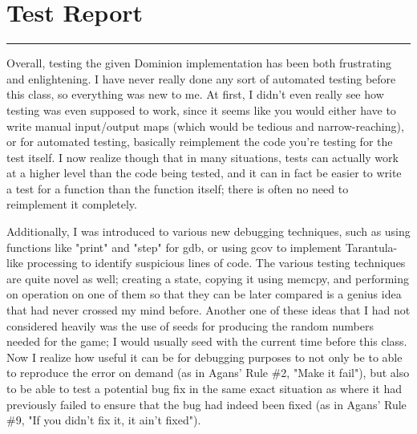 \documentclass[letterpaper,10pt,fleqn]{article}
\numberwithin{equation}{section}
\begin{document}

\section*{Test Report}
\hrule

Overall, testing the given Dominion implementation has been both frustrating and enlightening.  I have never really done any sort of automated testing before this class, so everything was new to me.  At first, I didn't even really see how testing was even supposed to work, since it seems like you would either have to write manual input/output maps (which would be tedious and narrow-reaching), or for automated testing, basically reimplement the code you're testing for the test itself.  I now realize though that in many situations, tests can actually work at a higher level than the code being tested, and it can in fact be easier to write a test for a function than the function itself; there is often no need to reimplement it completely.

Additionally, I was introduced to various new debugging techniques, such as using functions like "print" and "step" for gdb, or using gcov to implement Tarantula-like processing to identify suspicious lines of code.  The various testing techniques are quite novel as well; creating a state, copying it using memcpy, and performing on operation on one of them so that they can be later compared is a genius idea that had never crossed my mind before.  Another one of these ideas that I had not considered heavily was the use of seeds for producing the random numbers needed for the game; I would usually seed with the current time before this class.  Now I realize how useful it can be for debugging purposes to not only be to able to reproduce the error on demand (as in Agans' Rule \#2, "Make it fail"), but also to be able to test a potential bug fix in the same exact situation as where it had previously failed to ensure that the bug had indeed been fixed (as in Agans' Rule \#9, "If you didn't fix it, it ain't fixed").
\end{document}
